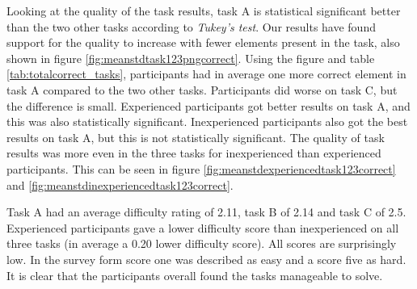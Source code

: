 Looking at the quality of the task results, task A is statistical significant better than the two other tasks according to \textit{Tukey's test}. Our results have found support for the quality to increase with fewer elements present in the task, also shown in figure \ref{fig:meanstdtask123pngcorrect}. Using the figure and table \ref{tab:totalcorrect_tasks}, participants had in average one more correct element in task A compared to the two other tasks. Participants did worse on task C, but the difference is small. Experienced participants got better results on task A, and this was also statistically significant. Inexperienced participants also got the best results on task A, but this is not statistically significant. The quality of task results was more even in the three tasks for inexperienced than experienced participants. This can be seen in figure \ref{fig:meanstdexperiencedtask123correct} and \ref{fig:meanstdinexperiencedtask123correct}. 


Task A had an average difficulty rating of 2.11, task B of 2.14 and task C of 2.5. Experienced participants gave a lower difficulty score than inexperienced on all three tasks (in average a 0.20 lower difficulty score). All scores are surprisingly low. In the survey form score one was described as easy and a score five as hard. It is clear that the participants overall found the tasks manageable to solve. 




